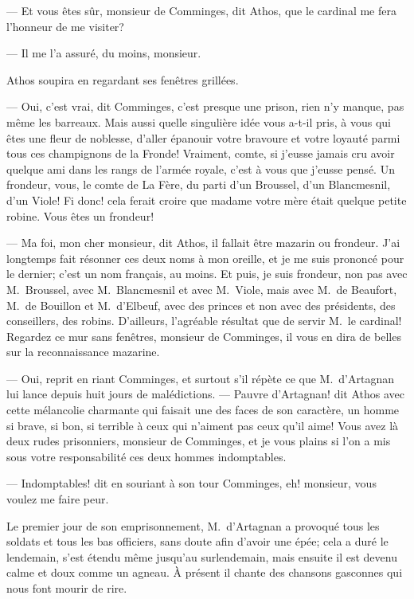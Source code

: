 — Et vous êtes sûr, monsieur de Comminges, dit Athos, que le cardinal me fera l'honneur de me visiter?

— Il me l'a assuré, du moins, monsieur.

Athos soupira en regardant ses fenêtres grillées.

— Oui, c'est vrai, dit Comminges, c'est presque une prison, rien n'y manque, pas même les barreaux. Mais aussi quelle singulière idée vous a-t-il pris, à vous qui êtes une fleur de noblesse, d'aller épanouir votre bravoure et votre loyauté parmi tous ces champignons de la Fronde! Vraiment, comte, si j'eusse jamais cru avoir quelque ami dans les rangs de l'armée royale, c'est à vous que j'eusse pensé. Un frondeur, vous, le comte de La Fère, du parti d'un Broussel, d'un Blancmesnil, d'un Viole! Fi donc! cela ferait croire que madame votre mère était quelque petite robine. Vous êtes un frondeur!

— Ma foi, mon cher monsieur, dit Athos, il fallait être mazarin ou frondeur. J'ai longtemps fait résonner ces deux noms à mon oreille, et je me suis prononcé pour le dernier; c'est un nom français, au moins. Et puis, je suis frondeur, non pas avec M.~Broussel, avec M.~Blancmesnil et avec M.~Viole, mais avec M.~de Beaufort, M.~de Bouillon et M.~d'Elbeuf, avec des princes et non avec des présidents, des conseillers, des robins. D'ailleurs, l'agréable résultat que de servir M.~le cardinal! Regardez ce mur sans fenêtres, monsieur de Comminges, il vous en dira de belles sur la reconnaissance mazarine.

— Oui, reprit en riant Comminges, et surtout s'il répète ce que M.~d'Artagnan lui lance depuis huit jours de malédictions.
— Pauvre d'Artagnan! dit Athos avec cette mélancolie charmante qui faisait une des faces de son caractère, un homme si brave, si bon, si terrible à ceux qui n'aiment pas ceux qu'il aime! Vous avez là deux rudes prisonniers, monsieur de Comminges, et je vous plains si l'on a mis sous votre responsabilité ces deux hommes indomptables.

— Indomptables! dit en souriant à son tour Comminges, eh! monsieur, vous voulez me faire peur.

Le premier jour de son emprisonnement, M.~d'Artagnan a provoqué tous les soldats et tous les bas officiers, sans doute afin d'avoir une épée; cela a duré le lendemain, s'est étendu même jusqu'au surlendemain, mais ensuite il est devenu calme et doux comme un agneau. À présent il chante des chansons gasconnes qui nous font mourir de rire.

